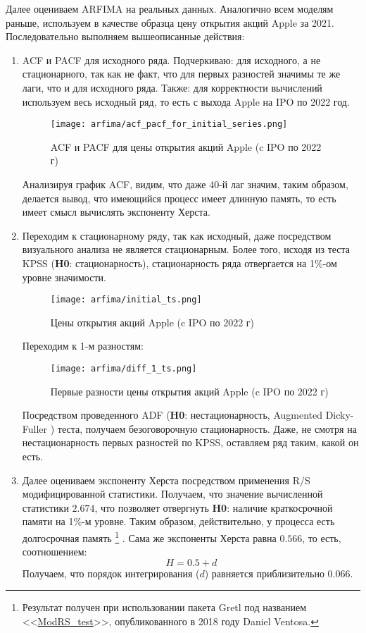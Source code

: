 \noindent Далее оцениваем ARFIMA на реальных данных. Аналогично всем моделям раньше, используем в качестве образца цену открытия акций Apple за 2021. Последовательно выполняем вышеописанные действия:
\begin{enumerate}
	\item ACF и PACF для исходного ряда. Подчеркиваю: для исходного, а не стационарного, так как не факт, что для первых разностей значимы те же лаги, что и для исходного ряда. Также: для корректности вычислений используем весь исходный ряд, то есть с выхода Apple на IPO по 2022 год.
	\begin{figure}[H]
		\centering
		\texttt{[image: arfima/acf\_pacf\_for\_initial\_series.png]}
		\caption{ACF и PACF для цены открытия акций Apple (c IPO по 2022 г)}
	\end{figure}
	Анализируя график ACF, видим, что даже 40-й лаг значим, таким образом, делается вывод, что имеющийся процесс имеет длинную память, то есть имеет смысл вычислять экспоненту Херста.
	
	\item Переходим к стационарному ряду, так как исходный, даже посредством визуального анализа не является стационарным. Более того, исходя из теста KPSS (\textbf{H0}: стационарность), стационарность ряда отвергается на 1\%-ом уровне значимости.
	\begin{figure}[H]
		\centering
		\texttt{[image: arfima/initial\_ts.png]}
		\caption{Цены открытия акций Apple (c IPO по 2022 г)}
	\end{figure}
	\noindent Переходим к 1-м разностям:
	\begin{figure}[H]
		\centering
		\texttt{[image: arfima/diff\_1\_ts.png]}
		\caption{Первые разности цены открытия акций Apple (c IPO по 2022 г)}
	\end{figure}
	\noindent Посредством проведенного ADF (\textbf{H0}: нестационарность, Augmented Dicky-Fuller \cite{adf_unit_root_test}) теста, получаем безоговорочную стационарность. Даже, не смотря на нестационарность первых разностей по KPSS, оставляем ряд таким, какой он есть.
	
	\item Далее оцениваем экспоненту Херста посредством применения R/S модифицированной статистики. Получаем, что значение вычисленной статистики $2.674$, что позволяет отвергнуть \textbf{H0}: наличие краткосрочной памяти на 1\%-м уровне. Таким образом, действительно, у процесса есть долгосрочная память \footnote{Результат получен при использовании пакета Gretl под названием <<\href{https://gretl.sourceforge.net/cgi-bin/gretldata.cgi?opt=SHOW_FUNCS}{ModRS\_test}>>, опубликованного в 2018 году Daniel Ventosa.} . Сама же экспоненты Херста равна $0.566$, то есть, соотношением:
	\begin{equation}
		H = 0.5 + d
	\end{equation}
	Получаем, что порядок интегрирования ($d$) равняется приблизительно $0.066$.
	

\end{enumerate}
